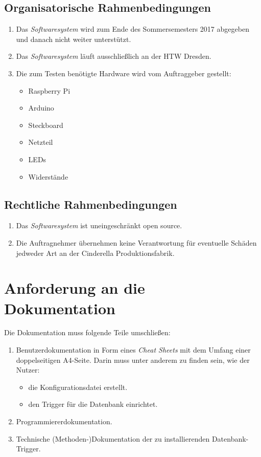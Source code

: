 \documentclass{scrartcl}
\begin{document}
\subsection{Organisatorische Rahmenbedingungen}
\begin{enumerate}[label=/OR\arabic*/]
\item Das \emph{Softwaresystem} wird zum Ende des Sommersemesters 2017 abgegeben und danach nicht weiter unterstützt.
\item Das \emph{Softwaresystem} läuft ausschließlich an der HTW Dresden.
\item Die zum Testen benötigte Hardware wird vom Auftraggeber gestellt:
\begin{itemize}
\item Raspberry Pi
\item Arduino
\item Steckboard
\item Netzteil
\item LEDs
\item Widerstände
\end{itemize}
\end{enumerate}
\subsection{Rechtliche Rahmenbedingungen}
\begin{enumerate}[label=/RR\arabic*/]
\item Das \emph{Softwaresystem} ist uneingeschränkt open source.
\item Die Auftragnehmer übernehmen keine Verantwortung für eventuelle Schäden jedweder Art an der Cinderella Produktionsfabrik.
\end{enumerate}
\section{Anforderung an die Dokumentation}
\label{doku}
Die Dokumentation muss folgende Teile umschließen:
\begin{enumerate}[label=/DA\arabic*/]
\item Benutzerdokumentation in Form eines \emph{Cheat Sheets} mit dem Umfang einer doppelseitigen A4-Seite. Darin muss unter anderem zu finden sein, wie der Nutzer:
\begin{itemize}
\item die Konfigurationsdatei erstellt.
\item den Trigger für die Datenbank einrichtet.
\end{itemize}
\item Programmiererdokumentation.
\item Technische (Methoden-)Dokumentation der zu installierenden Datenbank-Trigger.
\end{enumerate}
\end{document}
